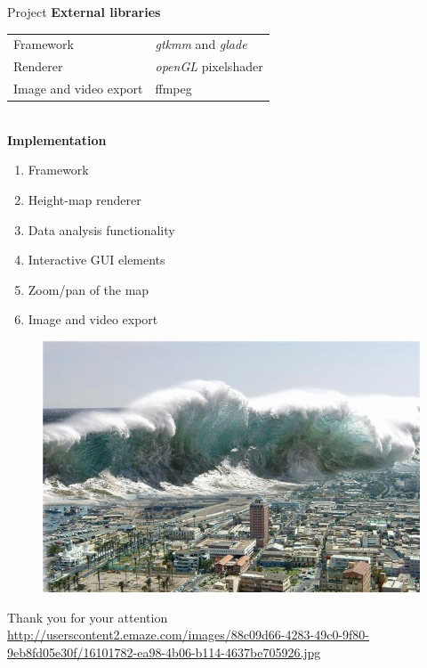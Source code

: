 \documentclass[shortpres,usenames,dvipsnames]{beamer}
\newcommand{\imgfullscale}{0.75}
\begin{document}
\begin{frame}{Project}
	\textbf{External libraries}\\\vspace{5pt}
	\begin{tabular}{ll}
		Framework & \textit{gtkmm} and \textit{glade}\\
		Renderer & \textit{openGL} pixelshader\\
		Image and video export & ffmpeg
	\end{tabular}
	\\\vspace{15pt}
	\textbf{Implementation}
	\begin{enumerate}
		\item Framework
		\item Height-map renderer
		\item Data analysis functionality
		\item Interactive GUI elements
		\item Zoom/pan of the map
		\item Image and video export
	\end{enumerate}
\end{frame}

\begin{frame}{}
	\begin{figure}
		\includegraphics[clip, width=\imgfullscale\linewidth]{img/tsunami.jpg}
	\end{figure}
	\centering
	\vspace{10pt}
	Thank you for your attention
	\\
	\vfill
	\flushleft
	{\fontsize{5}{5} \selectfont \url{http://userscontent2.emaze.com/images/88c09d66-4283-49c0-9f80-9eb8fd05e30f/16101782-ea98-4b06-b114-4637be705926.jpg}}
\end{frame}
	
\end{document}
